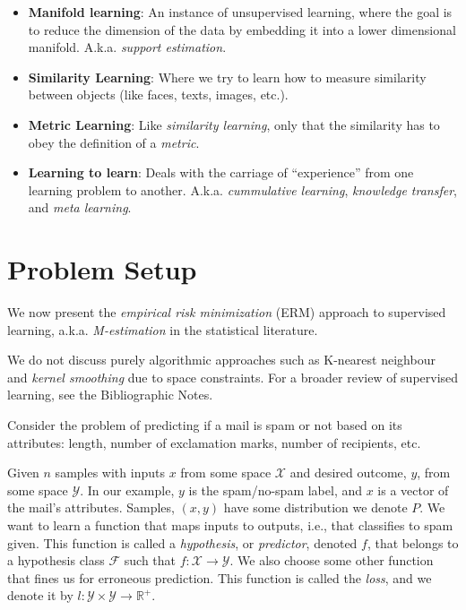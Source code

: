 \documentclass[]{book}
\theoremstyle{definition}
\theoremstyle{definition}
\theoremstyle{definition}
\theoremstyle{remark}
\let\BeginKnitrBlock\begin \let\EndKnitrBlock\end
\begin{document}
\begin{itemize}
\item
  \textbf{Manifold learning}: An instance of unsupervised learning, where the goal is to reduce the dimension of the data by embedding it into a lower dimensional manifold.
  A.k.a. \emph{support estimation}.
\item
  \textbf{Similarity Learning}: Where we try to learn how to measure similarity between objects (like faces, texts, images, etc.).
\item
  \textbf{Metric Learning}: Like \emph{similarity learning}, only that the similarity has to obey the definition of a \emph{metric}.
\item
  \textbf{Learning to learn}:
  Deals with the carriage of ``experience'' from one learning problem to another.
  A.k.a. \emph{cummulative learning}, \emph{knowledge transfer}, and \emph{meta learning}.
\end{itemize}

\hypertarget{problem-setup-3}{%
\section{Problem Setup}\label{problem-setup-3}}

We now present the \emph{empirical risk minimization} (ERM) approach to supervised learning, a.k.a. \emph{M-estimation} in the statistical literature.

\BeginKnitrBlock{remark}
{}We do not discuss purely algorithmic approaches such as K-nearest neighbour and \emph{kernel smoothing} due to space constraints.
For a broader review of supervised learning, see the Bibliographic Notes.
\EndKnitrBlock{remark}

\BeginKnitrBlock{example}[Rental Prices]
\protect\hypertarget{exm:rental-prices}{}{\label{exm:rental-prices} {} }Consider the problem of predicting if a mail is spam or not based on its attributes: length, number of exclamation marks, number of recipients, etc.
\EndKnitrBlock{example}

Given \(n\) samples with inputs \(x\) from some space \(\mathcal{X}\) and desired outcome, \(y\), from some space \(\mathcal{Y}\).
In our example, \(y\) is the spam/no-spam label, and \(x\) is a vector of the mail's attributes.
Samples, \((x,y)\) have some distribution we denote \(P\).
We want to learn a function that maps inputs to outputs, i.e., that classifies to spam given. This function is called a \emph{hypothesis}, or \emph{predictor}, denoted \(f\), that belongs to a hypothesis class \(\mathcal{F}\) such that \(f:\mathcal{X} \to \mathcal{Y}\).
We also choose some other function that fines us for erroneous prediction.
This function is called the \emph{loss}, and we denote it by \(l:\mathcal{Y}\times \mathcal{Y} \to \mathbb{R}^+\).
\end{document}
